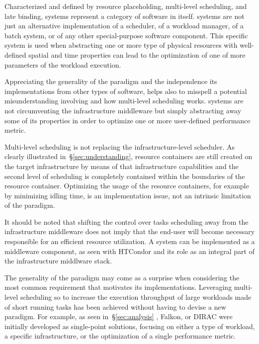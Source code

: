 \documentclass{sig-alternate}
\begin{document}
Characterized and defined by resource placeholding, multi-level scheduling, and
late binding, \pilot systems represent a category of software in itself. \pilot
systems are not just an alternative implementation of a scheduler, of a
workload manager, of a batch system, or of any other special-purpose software
component. This specific system is used when abstracting one or more type of
physical resources with well-defined spatial and time properties can lead to
the optimization of one of more parameters of the workload execution.

Appreciating the generality of the \pilot paradigm and the independence its
implementations from other types of software, helps also to misspell a
potential misunderstanding involving \pilots and how multi-level scheduling
works. \pilot systems are not circumventing the infrastructure middleware but
simply abstracting away some of its properties in order to optimize one or more
user-defined performance metric.

Multi-level scheduling is not replacing the infrastructure-level scheduler. As
clearly illustrated in~\S\ref{sec:understanding}, resource containers are still
created on the target infrastructure by means of that infrastructure
capabilities and the second level of scheduling is completely contained within
the boundaries of the resource container. Optimizing the usage of the resource
containers, for example by minimizing idling time, is an implementation issue,
not an intrinsic limitation of the \pilot paradigm.

It should be noted that shifting the control over tasks scheduling away from
the infrastructure middleware does not imply that the end-user will become
necessary responsible for an efficient resource utilization. A \pilot system
can be implemented as a middleware component, as seen with HTCondor and its
role as an integral part of the infrastructure middlware stack.

The generality of the \pilot paradigm may come as a surprise when considering
the most common requirement that motivates its implementations. Leveraging
multi-level scheduling so to increase the execution throughput of large
workloads made of short running tasks has been achieved without having to
devise a new paradigm. For example, as seen in~\S\ref{sec:analysis} \panda,
Falkon, or DIRAC were initially developed as single-point solutions, focusing
on either a type of workload, a specific infrastructure, or the optimization of
a single performance metric.
\end{document}
